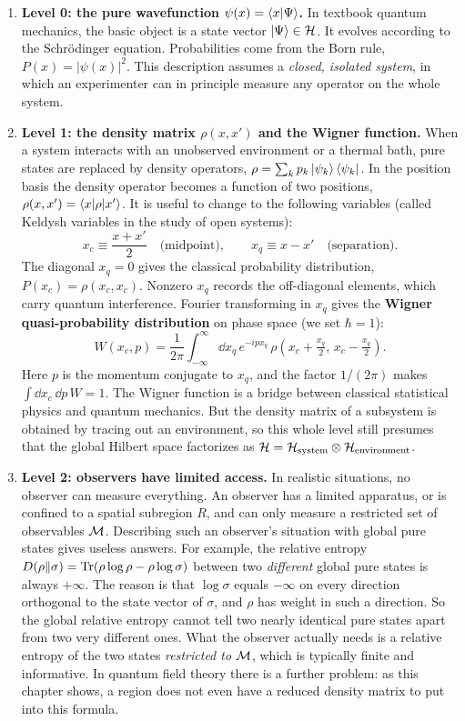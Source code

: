\begin{enumerate}[leftmargin=*]
\item \textbf{Level 0: the pure wavefunction $\psi(x) = \braket{x|\Psi}$.}
In textbook quantum mechanics, the basic object is a state vector $\ket\Psi \in \mathcal{H}$. It evolves according to
the Schr\"odinger equation. Probabilities come from the Born rule, $P(x) = |\psi(x)|^2$. This description
assumes a \emph{closed, isolated system}, in which an experimenter can in principle measure any operator on
the whole system.

\item \textbf{Level 1: the density matrix $\rho(x, x')$ and the Wigner function.}
When a system interacts with an unobserved environment or a thermal bath, pure states are replaced by
density operators, $\rho = \sum_k p_k \ket{\psi_k}\bra{\psi_k}$. In the position basis the density operator
becomes a function of two positions, $\rho(x, x') = \braket{x|\rho|x'}$. It is useful to change to the
following variables (called Keldysh variables in the study of open systems):
\[
x_c \equiv \frac{x + x'}{2} \quad \text{(midpoint)}, \qquad
x_q \equiv x - x' \quad \text{(separation)}.
\]
The diagonal $x_q = 0$ gives the classical probability distribution, $P(x_c) = \rho(x_c, x_c)$. Nonzero
$x_q$ records the off-diagonal elements, which carry quantum interference. Fourier transforming in $x_q$
gives the \textbf{Wigner quasi-probability distribution} on phase space (we set $\hbar=1$):
\[
W(x_c, p) = \frac{1}{2\pi}\int_{-\infty}^\infty \dd x_q\, e^{-i p x_q}\,
\rho\!\left(x_c + \tfrac{x_q}{2},\, x_c - \tfrac{x_q}{2}\right) .
\]
Here $p$ is the momentum conjugate to $x_q$, and the factor $1/(2\pi)$ makes $\int\dd x_c\,\dd p\,W=1$. The
Wigner function is a bridge between classical statistical physics and quantum mechanics. But the density
matrix of a subsystem is obtained by tracing out an environment, so this whole level still presumes that the
global Hilbert space factorizes as $\mathcal{H} = \mathcal{H}_{\rm system} \otimes \mathcal{H}_{\rm environment}$.

\item \textbf{Level 2: observers have limited access.}
In realistic situations, no observer can measure everything. An observer has a limited apparatus, or is
confined to a spatial subregion $R$, and can only measure a restricted set of observables $\mathcal{M}$. Describing
such an observer's situation with global pure states gives useless answers. For example, the relative entropy
$D(\rho\|\sigma) = \operatorname{Tr}(\rho\log\rho - \rho\log\sigma)$ between two \emph{different} global pure states is
always $+\infty$. The reason is that $\log\sigma$ equals $-\infty$ on every direction orthogonal to the state
vector of $\sigma$, and $\rho$ has weight in such a direction. So the global relative entropy cannot tell two
nearly identical pure states apart from two very different ones. What the observer actually needs is a
relative entropy of the two states \emph{restricted to} $\mathcal{M}$, which is typically finite and informative. In
quantum field theory there is a further problem: as this chapter shows, a region does not even have a reduced
density matrix to put into this formula.


\end{enumerate}
